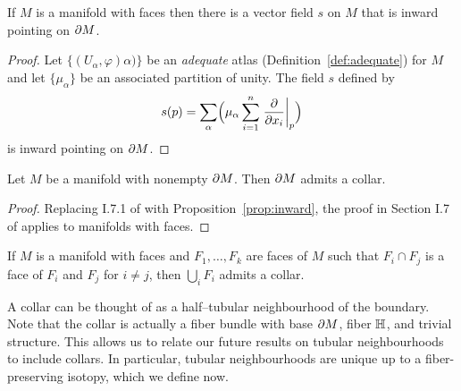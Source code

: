 \begin{prop}
	\label{prop:inward}
	If $M$ is a manifold with faces then there is a vector field $s$ on $M$ that is inward pointing on $\partial M$.	
\end{prop}

\begin{proof}
	Let $\{(U_\alpha,\varphi)\alpha)\}$ be an \emph{adequate} atlas (Definition~\ref{def:adequate}) for $M$ and let $\{\mu_\alpha\}$ be an associated partition of unity.
	The field $s$ defined by
	\[
		s(p) = \sum_\alpha \Bigl(\mu_\alpha\sum_{i=1}^n \left.\frac{\partial}{\partial x_i}\right|_{p}\Bigr)
	\]
	is inward pointing on $\partial M$.
\end{proof}

\begin{prop}
	\label{prop:collar2}
	Let $M$ be a manifold with nonempty $\partial M$.
	Then $\partial M$ admits a collar.
\end{prop}

\begin{proof}
	Replacing I.7.1 of \cite{Kosi93} with Proposition~\ref{prop:inward}, the proof in Section I.7 of \cite{Kosi93} applies to manifolds with faces.
\end{proof}

\begin{prop}
	If $M$ is a manifold with faces and $F_1,\dots,F_k$ are faces of $M$ such that $F_i\cap F_j$ is a face of $F_i$ and $F_j$ for $i\neq j$, then $\bigcup_i F_i$ admits a collar.
\end{prop}

A collar can be thought of as a half--tubular neighbourhood of the boundary.
Note that the collar is actually a fiber bundle with base $\partial M$, fiber $\mathbb{H}$, and trivial structure.
This allows us to relate our future results on tubular neighbourhoods to include collars.
In particular, tubular neighbourhoods are unique up to a fiber-preserving isotopy, which we define now.

